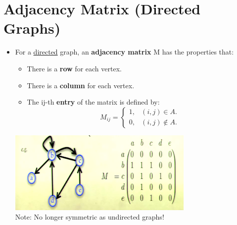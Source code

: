 \documentclass[12pt]{article}
\begin{document}
\section{Adjacency Matrix (Directed Graphs)}
\renewcommand{\labelitemii}{$\circ$}
\renewcommand{\labelitemiii}{$\cdot$}
\renewcommand{\labelitemiii}{$\rightarrow$}
\renewcommand{\labelitemiv}{$\star$}
\begin{itemize}
\item For a \underline{directed} graph, an \textbf{adjacency matrix} M has the properties that:
	\begin{itemize}
	\item There is a \textbf{row} for each vertex.
	\item There is a \textbf{column} for each vertex.
	\item The ij-th \textbf{entry} of the matrix is defined by:
	\begin{equation*}
  	M_{ij} = \begin{cases}
    	1, & \text{$(i, j) \in A$}.\\
    	0, & \text{$(i, j) \not\in A$}.
  	\end{cases}
	\end{equation*}
	\end{itemize}
\begin{center}
\includegraphics{lecture74}\\
Note: No longer symmetric as undirected graphs!
\end{center}
\end{itemize}
\end{document}
